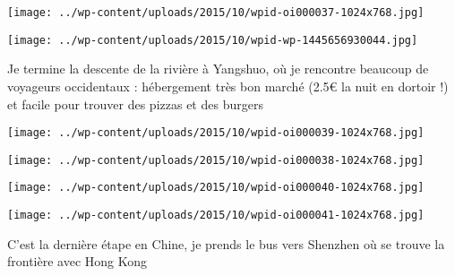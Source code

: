 \centerline{\texttt{[image: ../wp-content/uploads/2015/10/wpid-oi000037-1024x768.jpg]} } 
 \newline
 \newline
\centerline{\texttt{[image: ../wp-content/uploads/2015/10/wpid-wp-1445656930044.jpg]} } 
 \newline
 Je termine la descente de la rivière à Yangshuo, où je rencontre beaucoup de voyageurs occidentaux : hébergement très bon marché (2.5€ la nuit en dortoir !) et facile pour trouver des pizzas et des burgers \newline
 \newline
\centerline{\texttt{[image: ../wp-content/uploads/2015/10/wpid-oi000039-1024x768.jpg]} } 
 \newline
 \newline
\centerline{\texttt{[image: ../wp-content/uploads/2015/10/wpid-oi000038-1024x768.jpg]} } 
 \newline
 \newline
\centerline{\texttt{[image: ../wp-content/uploads/2015/10/wpid-oi000040-1024x768.jpg]} } 
 \newline
 \newline
\centerline{\texttt{[image: ../wp-content/uploads/2015/10/wpid-oi000041-1024x768.jpg]} } 
 \newline
 C'est la dernière étape en Chine, je prends le bus vers Shenzhen où se trouve la frontière avec Hong Kong \newline

\newpage
 
